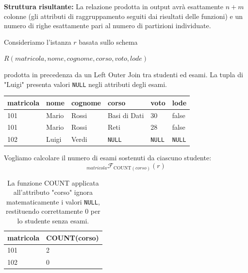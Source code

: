 \textbf{Struttura risultante:} La relazione prodotta in output avrà esattamente $n + m$ colonne (gli attributi di raggruppamento seguiti dai risultati delle funzioni) e un numero di righe esattamente pari al numero di partizioni individuate.

\begin{example}
    Consideriamo l'istanza $r$ basata sullo schema 
    
    \begin{center}
        $R(matricola, nome, cognome, corso, voto, lode)$
    \end{center}
    
    prodotta in precedenza da un Left Outer Join tra studenti ed esami. La tupla di "Luigi" presenta valori \texttt{NULL} negli attributi degli esami.
    
    \begin{table}[H]
        \centering
        \renewcommand{\arraystretch}{1.2}
        \begin{tabular}{llllll}
            \toprule
            \textbf{matricola} & \textbf{nome} & \textbf{cognome} & \textbf{corso} & \textbf{voto} & \textbf{lode} \\
            \midrule
            101 & Mario & Rossi & Basi di Dati & 30 & false \\
            101 & Mario & Rossi & Reti & 28 & false \\
            102 & Luigi & Verdi & \texttt{NULL} & \texttt{NULL} & \texttt{NULL} \\
            \bottomrule
        \end{tabular}
    \end{table}

    Vogliamo calcolare il numero di esami sostenuti da ciascuno studente:
    $$ {}_{matricola} \mathcal{F}_{\text{COUNT}(corso)}(r) $$

    \begin{table}[H]
        \centering
        \renewcommand{\arraystretch}{1.2}
        \begin{tabular}{ll}
            \toprule
            \textbf{matricola} & \textbf{COUNT(corso)} \\
            \midrule
            101 & 2 \\
            102 & 0 \\
            \bottomrule
        \end{tabular}
        \caption{La funzione COUNT applicata all'attributo "corso" ignora matematicamente i valori \texttt{NULL}, restituendo correttamente 0 per lo studente senza esami.}
    \end{table}
\end{example}

